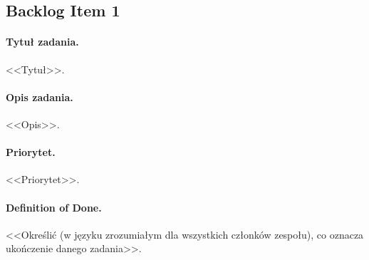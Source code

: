 	\subsection{Backlog Item 1}
	\paragraph{Tytuł zadania.} <<Tytuł>>.
	\paragraph{Opis zadania.} <<Opis>>.
	\paragraph{Priorytet.} <<Priorytet>>.
	\paragraph{Definition of Done.} <<Określić (w języku zrozumiałym dla wszystkich członków zespołu), co oznacza ukończenie danego zadania>>.